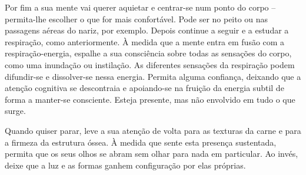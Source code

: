 Por fim a sua mente vai querer aquietar e centrar-se num ponto do corpo -- permita-lhe escolher o que for mais confortável. Pode ser no peito ou nas passagens aéreas do nariz, por exemplo. Depois continue a seguir e a estudar a respiração, como anteriormente. À medida que a mente entra em fusão com a respiração-energia, espalhe a sua consciência sobre todas as sensações do corpo, como uma inundação ou instilação. As diferentes sensações da respiração podem difundir-se e dissolver-se nessa energia. Permita alguma confiança, deixando que a atenção cognitiva se descontraia e apoiando-se na fruição da energia subtil de forma a manter-se consciente. Esteja presente, mas não envolvido em tudo o que surge.

Quando quiser parar, leve a sua atenção de volta para as texturas da carne e para a firmeza da estrutura óssea. À medida que sente esta presença sustentada, permita que os seus olhos se abram sem olhar para nada em particular. Ao invés, deixe que a luz e as formas ganhem configuração por elas próprias.
